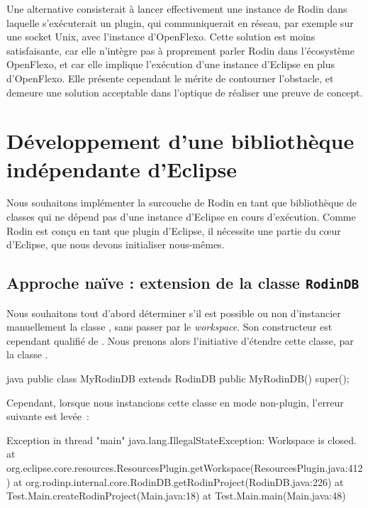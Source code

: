 Une alternative consisterait à lancer effectivement une instance de Rodin dans laquelle s'exécuterait un plugin, qui communiquerait %
en réseau, par exemple sur une socket Unix, avec l'instance d'OpenFlexo.
Cette solution est moins satisfaisante, car elle n'intègre pas à proprement parler Rodin dans l'écosystème OpenFlexo, et car elle implique l'exécution %
d'une instance d'Eclipse en plus d'OpenFlexo.
Elle présente cependant le mérite de contourner l'obstacle, et demeure une solution acceptable dans l'optique de réaliser une preuve de concept.


\section{Développement d'une bibliothèque indépendante d'Eclipse}

Nous souhaitons implémenter la surcouche de Rodin en tant que bibliothèque de classes qui ne dépend pas d'une instance d'Eclipse en cours d'exécution.
Comme Rodin est conçu en tant que plugin d'Eclipse, il nécessite une partie du cœur d'Eclipse, que nous devons initialiser nous-mêmes.

\subsection{Approche naïve : extension de la classe \texttt{RodinDB}}

Nous souhaitons tout d'abord déterminer s'il est possible ou non d'instancier manuellement la classe , sans passer par le \textit{workspace}.
Son constructeur est cependant qualifié de .
Nous prenons alors l'initiative d'étendre cette classe, par la classe .

\begin{imtaCode}{java}
public class MyRodinDB extends RodinDB {
    public MyRodinDB() {
        super();
    }
}
\end{imtaCode}

Cependant, lorsque nous instancions cette classe en mode non-plugin, l'erreur suivante est levée~:

\begin{imtaConsole}
Exception in thread "main" java.lang.IllegalStateException: Workspace is closed.
	at org.eclipse.core.resources.ResourcesPlugin.getWorkspace(ResourcesPlugin.java:412)
	at org.rodinp.internal.core.RodinDB.getRodinProject(RodinDB.java:226)
	at Test.Main.createRodinProject(Main.java:18)
	at Test.Main.main(Main.java:48)
\end{imtaConsole}

